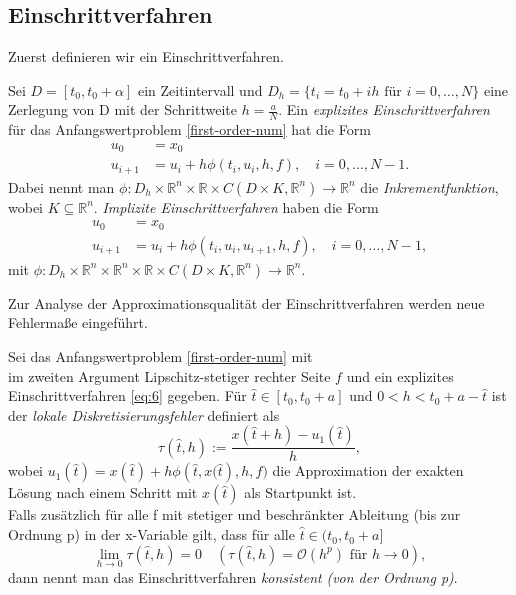\subsection{Einschrittverfahren}
Zuerst definieren wir ein Einschrittverfahren.
\begin{definition}
    Sei $D=[t_0,t_0+\alpha]$ ein Zeitintervall und
    $D_h=\{t_i=t_0 + ih \text{ für } i=0, \dots,N\}$ eine Zerlegung von D mit der Schrittweite $h=\frac{a}{N}$.
    Ein {\em explizites Einschrittverfahren} für das Anfangswertproblem \eqref{first-order-num} hat die Form
    \begin{align}
        u_0 &= x_0 \nonumber \\
        u_{i+1} &= u_i + h \phi(t_i,u_i,h,f), \quad i=0,\dots,N-1. \label{eq:6}
    \end{align}
    Dabei nennt man
    $\phi:D_h \times \mathbb{R}^n \times \mathbb{R} \times C(D \times K,\mathbb{R}^n) \rightarrow \mathbb{R}^n$ die
    {\em Inkrementfunktion}, wobei $K \subseteq \mathbb{R}^n$.
    {\em Implizite Einschrittverfahren} haben die Form
    \begin{align*}
        u_0 &= x_0\\
        u_{i+1} &= u_i + h\phi(t_i,u_i,u_{i+1},h,f), \quad i=0,\dots,N-1,
    \end{align*}
    mit $\phi:D_h \times \mathbb{R}^n \times \mathbb{R}^n \times \mathbb{R} \times C(D \times K,\mathbb{R}^n)
    \rightarrow \mathbb{R}^n$.
\end{definition}
Zur Analyse der Approximationsqualität der Einschrittverfahren werden neue Fehlermaße eingeführt.
\begin{definition}
    Sei das Anfangswertproblem \eqref{first-order-num} mit \\ im zweiten Argument Lipschitz-stetiger
    rechter Seite $f$ und ein explizites Einschrittverfahren \eqref{eq:6} gegeben.
    Für $\hat{t}\in [t_0,t_0+a]$ und $0 < h < t_0 + a - \hat{t}$ ist der {\em lokale Diskretisierungsfehler} definiert als
    \[
        \tau(\hat{t}, h) := \frac{x(\hat{t} + h) - u_1(\hat{t})}{h},
    \] wobei $u_1(\hat{t})=x(\hat{t}) + h\phi\left(\hat{t},x(\hat{t}\right),h,f) $ die Approximation der exakten
    Lösung nach einem Schritt mit $x(\hat{t})$ als Startpunkt ist.\\
    Falls zusätzlich für alle f mit stetiger und beschränkter Ableitung (bis zur Ordnung p) in der x-Variable gilt, dass
    für alle $\hat{t} \in (t_0, t_0+a]$
    \[
        \lim_{h \rightarrow 0 } \tau(\hat{t}, h)=0 \quad (\tau(\hat{t},h) = \mathcal{O}(h^p) \text{ für } h \rightarrow 0),
    \] dann nennt man das Einschrittverfahren {\em konsistent} {\em (von der Ordnung p)}.
\end{definition}
